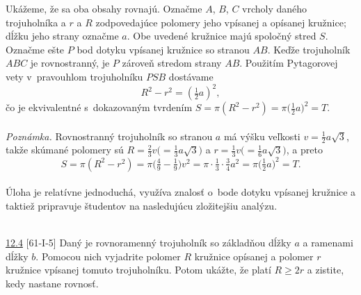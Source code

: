 \rieh Ukážeme, že sa oba obsahy rovnajú. Označme $A$, $B$, $C$ vrcholy daného trojuholníka a $r$ a $R$ zodpovedajúce polomery jeho vpísanej a opísanej kružnice; dĺžku jeho strany označme $a$. Obe uvedené kružnice majú spoločný stred $S$. Označme ešte $P$ bod dotyku vpísanej kružnice so stranou $AB$. Keďže trojuholník $ABC$ je rovnostranný, je $P$ zároveň stredom strany $AB$. Použitím Pytagorovej vety v~pravouhlom trojuholníku $PSB$ dostávame
$$R^2 - r^2=  (\tfrac{1}{2}a)^2,$$
čo je ekvivalentné s~dokazovaným tvrdením $S = \pi (R^2 - r^2) = \pi \big( \frac{1}{2}a\big)^2= T$.\\
\\
\textit{Poznámka.} Rovnostranný trojuholník so stranou $a$ má výšku veľkosti $v = \frac{1}{2}a \sqrt{3}$, takže skúmané polomery sú $R =\frac{2}{3}v \big(=\frac{1}{3}a\sqrt{3}\big)$ a $r =\frac{1}{3}v \big(=\frac{1}{6}a\sqrt{3}\big)$, a preto
$$S = \pi ( R^2 - r^2) = \pi \big( \tfrac{4}{9} -\tfrac{1}{9})v^2= \pi \cdot \tfrac{1}{3}\cdot\tfrac{3}{4}a^2= \pi \big( \tfrac{1}{2}a\big)^2= T.$$
\\
\kom Úloha je relatívne jednoduchá, využíva znalosť o~bode dotyku vpísanej kružnice a taktiež pripravuje študentov na nasledujúcu zložitejšiu analýzu. \\
\\
\begin{tcolorbox}[breakable,notitle,boxrule=0pt,colback=light-gray,colframe=light-gray]\ul{12.4} [61-I-5] Daný je rovnoramenný trojuholník so základňou dĺžky $a$ a ramenami dĺžky $b$. Pomocou nich vyjadrite polomer $R$ kružnice opísanej a polomer $r$ kružnice vpísanej tomuto trojuholníku. Potom ukážte, že platí $R \geq 2r$ a zistite, kedy nastane rovnosť.

\end{tcolorbox}

